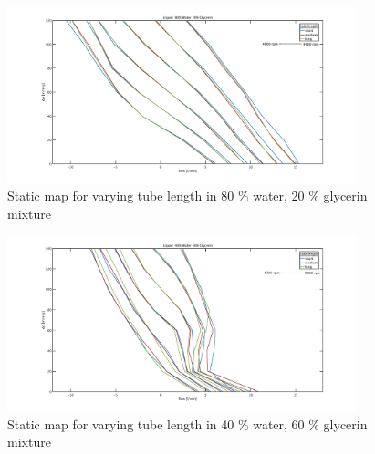 \begin{figure}[h]
  \includegraphics[width=0.9\textwidth]{images/plots_syst_ident/80w20g_tube_length.pdf}
  \caption[Static map for different tube length in 80 \% water, 20 \% glycerin mixture]{Static map for varying tube length in 80 \% water, 20 \% glycerin mixture}
\end{figure}

\begin{figure}[h]
  \includegraphics[width=0.9\textwidth]{images/plots_syst_ident/40w60g_tube_length.pdf}
  \caption[Static map for different tube length in 40 \% water, 60 \% glycerin mixture]{Static map for varying tube length in 40 \% water, 60 \% glycerin mixture}
\end{figure}
